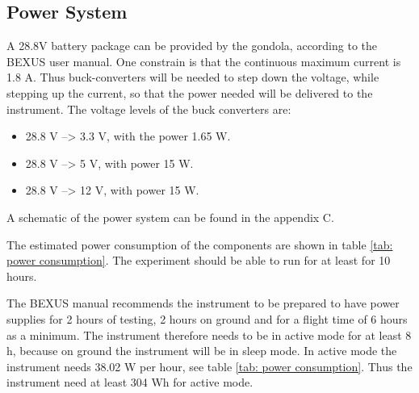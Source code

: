 \pagebreak
\subsection{Power System}
A 28.8V battery package can be provided by the gondola, according to the BEXUS user manual. One constrain is that the continuous maximum current is 1.8 A. Thus buck-converters will be needed to step down the voltage, while stepping up the current, so that the power needed will be delivered to the instrument. The voltage levels of the buck converters are: 

\begin{itemize}
	\item 28.8 V --> 3.3 V, with the power 1.65 W.
	\item 28.8 V --> 5 V, with power 15 W.
	\item 28.8 V --> 12 V, with power 15 W.
\end{itemize}

A schematic of the power system can be found in the appendix C.

The estimated power consumption of the components are shown in table \ref{tab: power consumption}. The experiment should be able to run for at least for 10 hours. 


The BEXUS manual recommends the instrument to be prepared to have power supplies for 2 hours of testing, 2 hours on ground and for a flight time of 6 hours as a minimum. The instrument therefore needs to be in active mode for at least 8 h, because on ground the instrument will be in sleep mode. In active mode the instrument needs 38.02 W per hour, see table \ref{tab: power consumption}. Thus the instrument need at least 304 Wh for active mode. 





\raggedbottom
